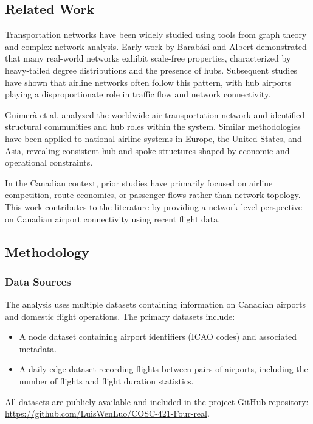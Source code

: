 \documentclass[9pt]{article}
\begin{document}
\subsection{Related Work}

Transportation networks have been widely studied using tools from graph theory and complex network analysis. Early work by Barabási and Albert demonstrated that many real-world networks exhibit scale-free properties, characterized by heavy-tailed degree distributions and the presence of hubs. Subsequent studies have shown that airline networks often follow this pattern, with hub airports playing a disproportionate role in traffic flow and network connectivity.

Guimerà et al. analyzed the worldwide air transportation network and identified structural communities and hub roles within the system. Similar methodologies have been applied to national airline systems in Europe, the United States, and Asia, revealing consistent hub-and-spoke structures shaped by economic and operational constraints.

In the Canadian context, prior studies have primarily focused on airline competition, route economics, or passenger flows rather than network topology. This work contributes to the literature by providing a network-level perspective on Canadian airport connectivity using recent flight data.

\subsection{Methodology}

\subsubsection{Data Sources}

The analysis uses multiple datasets containing information on Canadian airports and domestic flight operations. The primary datasets include:
\begin{itemize}
    \item A node dataset containing airport identifiers (ICAO codes) and associated metadata.
    \item A daily edge dataset recording flights between pairs of airports, including the number of flights and flight duration statistics.
\end{itemize}

All datasets are publicly available and included in the project GitHub repository: \url{https://github.com/LuisWenLuo/COSC-421-Four-real}.
\end{document}
